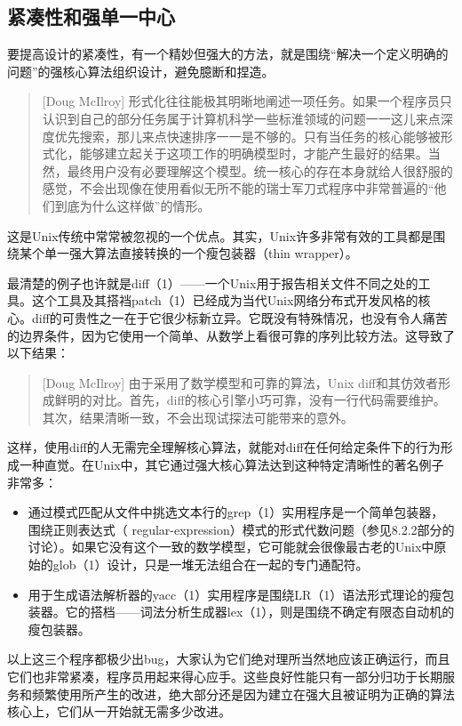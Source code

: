 \documentclass[12pt,oneside]{book}
\begin{document}
\subsection{紧凑性和强单一中心}
要提高设计的紧凑性，有一个精妙但强大的方法，就是围绕“解决一个定义明确的问题”的强核心算法组织设计，避免臆断和捏造。

\begin{quote}[Doug McIlroy]
形式化往往能极其明晰地阐述一项任务。如果一个程序员只认识到自己的部分任务属于计算机科学一些标淮领域的问题一一这儿来点深度优先搜索，那儿来点快速排序一一是不够的。只有当任务的核心能够被形式化，能够建立起关于这项工作的明确模型时，才能产生最好的结果。当然，最终用户没有必要理解这个模型。统一核心的存在本身就给人很舒服的感觉，不会出现像在使用看似无所不能的瑞士军刀式程序中非常普遍的“他们到底为什么这样做”的情形。
\end{quote}

这是Unix传统中常常被忽视的一个优点。其实，Unix许多非常有效的工具都是围绕某个单一强大算法直接转换的一个瘦包装器（thin wrapper）。

最清楚的例子也许就是diff（1）——一个Unix用于报告相关文件不同之处的工具。这个工具及其搭裆patch（1）已经成为当代Unix网络分布式开发风格的核心。diff的可贵性之一在于它很少标新立异。它既没有特殊情况，也没有令人痛苦的边界条件，因为它使用一个简单、从数学上看很可靠的序列比较方法。这导致了以下结果：

\begin{quote}[Doug McIlroy]
由于采用了数学模型和可靠的算法，Unix diff和其仿效者形成鲜明的对比。首先，diff的核心引擎小巧可靠，没有一行代码需要维护。其次，结果清晰一致，不会出现试探法可能带来的意外。
\end{quote}

这样，使用diff的人无需完全理解核心算法，就能对diff在任何给定条件下的行为形成一种直觉。在Unix中，其它通过强大核心算法达到这种特定清晰性的著名例子非常多：

\begin{itemize}
\item 通过模式匹配从文件中挑选文本行的grep（1）实用程序是一个简单包装器，围绕正则表达式（ regular-expression）模式的形式代数问题（参见8.2.2部分的讨论）。如果它没有这个一致的数学模型，它可能就会很像最古老的Unix中原始的glob（1）设计，只是一堆无法组合在一起的专门通配符。
\item 用于生成语法解析器的yacc（1）实用程序是围绕LR（1）语法形式理论的瘦包装器。它的搭档——词法分析生成器lex（1），则是围绕不确定有限态自动机的瘦包装器。
\end{itemize}

以上这三个程序都极少出bug，大家认为它们绝对理所当然地应该正确运行，而且它们也非常紧凑，程序员用起来得心应手。这些良好性能只有一部分归功于长期服务和频繁使用所产生的改进，绝大部分还是因为建立在强大且被证明为正确的算法核心上，它们从一开始就无需多少改进。
\end{document}
